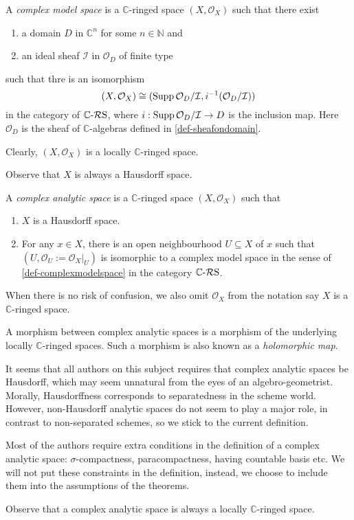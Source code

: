 \begin{definition}\label{def-complexmodelspace}
    A \emph{complex model space} is a $\mathbb{C}$-ringed space $(X,\mathcal{O}_X)$ such that there exist
    \begin{enumerate}
        \item a domain $D$ in $\mathbb{C}^n$ for some $n\in \mathbb{N}$ and
        \item an ideal sheaf $\mathcal{I}$ in $\mathcal{O}_D$ of finite type
    \end{enumerate}
    such that thre is an isomorphism
    \[
        (X,\mathcal{O}_X)\cong (\operatorname{Supp} \mathcal{O}_D/\mathcal{I},i^{-1}(\mathcal{O}_D/\mathcal{I}))
    \]
    in the category of $\mathbb{C}\text{-}\mathcal{R}\mathrm{S}$, where $i:\operatorname{Supp} \mathcal{O}_D/\mathcal{I}\rightarrow D$ is the inclusion map. Here $\mathcal{O}_D$ is the sheaf of $\mathbb{C}$-algebras defined in \cref{def-sheafondomain}.

    Clearly, $(X,\mathcal{O}_X)$ is a locally $\mathbb{C}$-ringed space.
\end{definition}
Observe that $X$ is always a Hausdorff space.

\begin{definition}\label{def-complexanalyticspace}
    A \emph{complex analytic space} is a $\mathbb{C}$-ringed space $(X,\mathcal{O}_X)$ such that 
    \begin{enumerate}
        \item $X$ is a Hausdorff space.
        \item For any $x\in X$, there is an open neighbourhood $U\subseteq X$ of $x$ such that $(U,\mathcal{O}_U:=\mathcal{O}_X|_U)$ is isomorphic to a complex model space in the sense of \cref{def-complexmodelspace} in the category $\mathbb{C}\text{-}\mathcal{R}\mathrm{S}$.
    \end{enumerate}
    When there is no risk of confusion, we also omit $\mathcal{O}_X$ from the notation say $X$ is a $\mathbb{C}$-ringed space.

    A morphism between complex analytic spaces is a morphism of the underlying locally $\mathbb{C}$-ringed spaces. Such a morphism is also known as a \emph{holomorphic map}.
\end{definition}
\begin{remark}
    It seems that all authors on this subject requires that complex analytic spaces be Hausdorff, which may seem unnatural from the eyes of an algebro-geometrist. Morally, Hausdorffness corresponds to separatedness in the scheme world. However, non-Hausdorff analytic spaces do not seem to play a major role, in contrast to non-separated schemes, so we stick to the current definition.
\end{remark}
\begin{remark}
    Most of the authors require extra conditions in the definition of a complex analytic space: $\sigma$-compactness, paracompactness, having countable basis etc. We will not put these constraints in the definition, instead, we choose to include them into the assumptions of the theorems.
\end{remark}
Observe that a complex analytic space is always a locally $\mathbb{C}$-ringed space.

